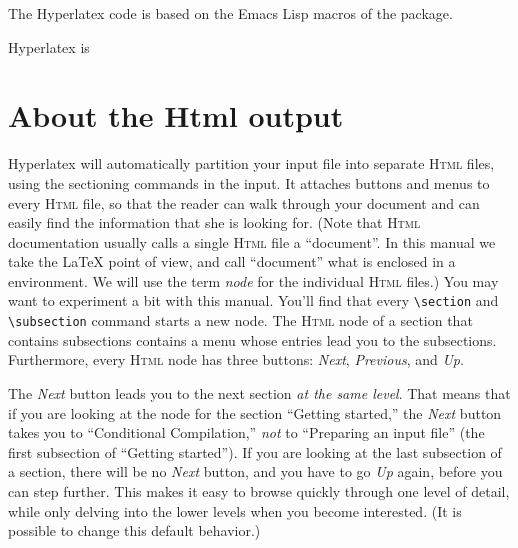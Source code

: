 \documentclass[a4paper]{article}
\newcommand{\+}{\verb+}
\renewcommand{\=}{\back{}}
\newcommand{\Html}{\textsc{Html}\xspace }
\newcommand{\latex}{\LaTeX\xspace }
\begin{document}
The Hyperlatex code is based on the Emacs Lisp macros of the
 package.

Hyperlatex is 

\section{About the Html output}
\label{sec:about-html}

\label{nodes}
 Hyperlatex will automatically partition your input file
into separate \Html files, using the sectioning commands in the input.
It attaches buttons and menus to every \Html file, so that the reader
can walk through your document and can easily find the information
that she is looking for.  (Note that \Html documentation usually calls
a single \Html file a ``document''. In this manual we take the
\latex point of view, and call ``document'' what is enclosed in a
 environment. We will use the term \emph{node} for the
individual \Html files.)  You may want to experiment a bit with
\texonly{the \Html version of} this manual. You'll find that every
\+\section+ and \+\subsection+ command starts a new node. The \Html
node of a section that contains subsections contains a menu whose
entries lead you to the subsections. Furthermore, every \Html node has
three buttons: \emph{Next}, \emph{Previous}, and \emph{Up}.

The \emph{Next} button leads you to the next section \emph{at the same
  level}. That means that if you are looking at the node for the
section ``Getting started,'' the \emph{Next} button takes you to
``Conditional Compilation,'' \emph{not} to ``Preparing an input file''
(the first subsection of ``Getting started''). If you are looking at the
last subsection of a section, there will be no \emph{Next} button, and
you have to go \emph{Up} again, before you can step further.  This
makes it easy to browse quickly through one level of detail, while
only delving into the lower levels when you become interested.
(It is possible to change this default behavior.)
\end{document}

